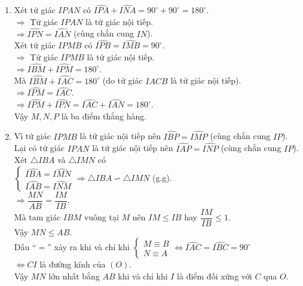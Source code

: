 \begin{ex}
{\begin{center}
	\end{center}
	\begin{enumerate}
		\item Xét tứ giác $IPAN$ có $\widehat{IPA}+\widehat{INA}=90^\circ+90^\circ=180^\circ$.\\
		$\Rightarrow$ Tứ giác $IPAN$ là tứ giác nội tiếp.\\
		$\Rightarrow \widehat{IPN}=\widehat{IAN}$ (cùng chắn cung $IN$).\\
		Xét tứ giác $IPMB$ có $\widehat{IPB}=\widehat{IMB}=90^\circ$.\\
		$\Rightarrow$ Tứ giác $IPMB$ là tứ giác nội tiếp.\\
		$\Rightarrow \widehat{IBM}+\widehat{IPM}=180^\circ$.\\
		Mà $\widehat{IBM}+\widehat{IAC}=180^\circ$ (do tứ giác $IACB$ là tứ giác nội tiếp).\\
		$\Rightarrow \widehat{IPM}=\widehat{IAC}$.\\
		$\Rightarrow \widehat{IPM}+\widehat{IPN}=\widehat{IAC}+\widehat{IAN}=180^\circ$.\\
		Vậy $M,N,P$ là ba điểm thẳng hàng.
		\item Vì tứ giác $IPMB$ là tứ giác nội tiếp nên $\widehat{IBP}=\widehat{IMP}$ (cùng chắn cung $IP$).\\
		Lại có tứ giác $IPAN$ là tứ giác nội tiếp nên $\widehat{IAP}=\widehat{INP}$ (cùng chắn cung $IP$).\\
		Xét $\triangle IBA$ và $\triangle IMN$ có\\
		$\begin{cases} \widehat{IBA}=\widehat{IMN} \\ \widehat{IAB}=\widehat{INM} \end{cases}\Rightarrow \triangle IBA\backsim \triangle IMN$ (g.g).\\
		$\Rightarrow \dfrac{MN}{AB}=\dfrac{IM}{IB}$.\\
		Mà tam giác $IBM$ vuông tại $M$ nên $IM\leq IB$ hay $\dfrac{IM}{IB}\leq 1$.\\
		Vậy $MN\leq AB$.\\
		Dấu ``$=$'' xảy ra khi và chỉ khi $\begin{cases} M\equiv B \\ N\equiv A \end{cases}\Leftrightarrow \widehat{IAC}=\widehat{IBC}=90^\circ$\\
		$\Leftrightarrow CI$ là đường kính của $(O)$.\\
		Vậy $MN$ lớn nhất bằng $AB$ khi và chỉ khi $I$ là điểm đối xứng với $C$ qua $O$.
	\end{enumerate}
	}
\end{ex}
